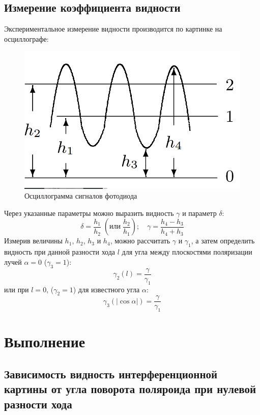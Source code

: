 \documentclass[a4paper,12pt]{article}
\begin{document}
\subsection{Измерение коэффициента видности}
Экспериментальное измерение видности производится по картинке на осциллографе:
\begin{figure}[h!]
	\begin{center}
		\includegraphics[scale = 0.22]{1.png}
		\caption{Осциллограмма сигналов фотодиода}
		\label{p1}
	\end{center}
\end{figure}
\newpage
Через указанные параметры можно выразить видность $\gamma$ и параметр $\delta$:
\begin{equation}\label{eq:exp}
\delta = \frac{h_1}{h_2} \;(\text{или} \; \frac{h_2}{h_1}); \quad \gamma = \frac{h_4-h_3}{h_4+h_3}
\end{equation}
Измерив величины $h_1$, $h_2$, $h_3$ и $h_4$, можно рассчитать $\gamma$ и $\gamma_1$, а затем определить видность при данной разности хода $l$ для угла между плоскостями поляризации лучей $\alpha = 0$ ($\gamma_3 = 1$):
\[ \gamma_2(l) = \frac{\gamma}{\gamma_1}\]
или при $l = 0$, ($\gamma_2 = 1$) для известного угла $\alpha$:
\[ \gamma_3\left(|\cos{\alpha}|\right) = \frac{\gamma}{\gamma_1}\]

\section{Выполнение}
\subsection{Зависимость видность интерференционной картины от угла поворота поляроида при нулевой разности хода}
\end{document}
